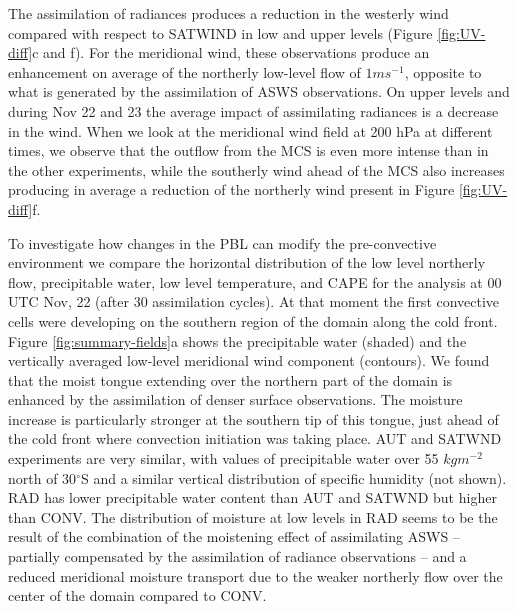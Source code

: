 \documentclass[final,5p,times,twocolumn,authoryear]{elsarticle} %
\begin{document}
The assimilation of radiances produces a reduction in the westerly wind compared with respect to SATWIND in low and upper levels (Figure \ref{fig:UV-diff}c and f). For the meridional wind, these observations produce an enhancement on average of the northerly low-level flow of \(1 ms^{-1}\), opposite to what is generated by the assimilation of ASWS observations. On upper levels and during Nov 22 and 23 the average impact of assimilating radiances is a decrease in the wind. When we look at the meridional wind field at 200 hPa at different times, we observe that the outflow from the MCS is even more intense than in the other experiments, while the southerly wind ahead of the MCS also increases producing in average a reduction of the northerly wind present in Figure \ref{fig:UV-diff}f.~

To investigate how changes in the PBL can modify the pre-convective environment we compare the horizontal distribution of the low level northerly flow, precipitable water, low level temperature, and CAPE for the analysis at 00 UTC Nov, 22 (after 30 assimilation cycles). At that moment the first convective cells were developing on the southern region of the domain along the cold front. Figure \ref{fig:summary-fields}a shows the precipitable water (shaded) and the vertically averaged low-level meridional wind component (contours). We found that the moist tongue extending over the northern part of the domain is enhanced by the assimilation of denser surface observations. The moisture increase is particularly stronger at the southern tip of this tongue, just ahead of the cold front where convection initiation was taking place. AUT and SATWND experiments are very similar, with values of precipitable water over 55 \(kgm^{-2}\) north of 30\(^{\circ}\)S and a similar vertical distribution of specific humidity (not shown). RAD has lower precipitable water content than AUT and SATWND but higher than CONV. The distribution of moisture at low levels in RAD seems to be the result of the combination of the moistening effect of assimilating ASWS -- partially compensated by the assimilation of radiance observations -- and a reduced meridional moisture transport due to the weaker northerly flow over the center of the domain compared to CONV.
\end{document}
